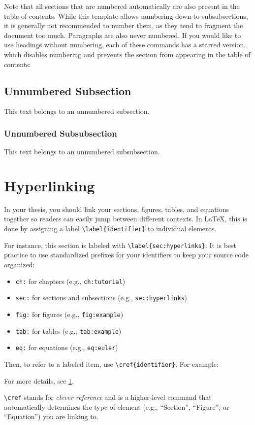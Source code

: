 Note that all sections that are numbered automatically are also present in the table of contents. While this
template allows numbering down to subsubsections, it is generally not recommended to number them, as they tend to
fragment the document too much. Paragraphs are also never numbered. If you would like to use headings without
numbering, each of these commands has a starred version, which disables numbering and prevents the section from
appearing in the table of contents:

\subsection*{Unnumbered Subsection}

This text belongs to an unnumbered subsection.

\subsubsection*{Unnumbered Subsubsection}

This text belongs to an unnumbered subsubsection.


\section{Hyperlinking}
\label{sec:hyperlinks}

In your thesis, you should link your sections, figures, tables, and equations together so readers can easily jump
between different contexts. In \LaTeX{}, this is done by assigning a label \verb|\label{identifier}|
to individual elements.

For instance, this section is labeled with \verb|\label{sec:hyperlinks}|. It is best practice to use standardized
prefixes for your identifiers to keep your source code organized:
\begin{itemize}
    \item \verb|ch:| for chapters (e.g., \verb|ch:tutorial|)
    \item \verb|sec:| for sections and subsections (e.g., \verb|sec:hyperlinks|)
    \item \verb|fig:| for figures (e.g., \verb|fig:example|)
    \item \verb|tab:| for tables (e.g., \verb|tab:example|)
    \item \verb|eq:| for equations (e.g., \verb|eq:euler|)
\end{itemize}

Then, to refer to a labeled item, use \verb|\cref{identifier}|. For example:
\begin{displayquote}
    For more details, see \cref{sec:hyperlinks}.
\end{displayquote}
\verb|\cref| stands for \emph{clever reference} and is a higher-level command that automatically determines
the type of element (e.g., \enquote{Section}, \enquote{Figure}, or \enquote{Equation}) you are linking to.

